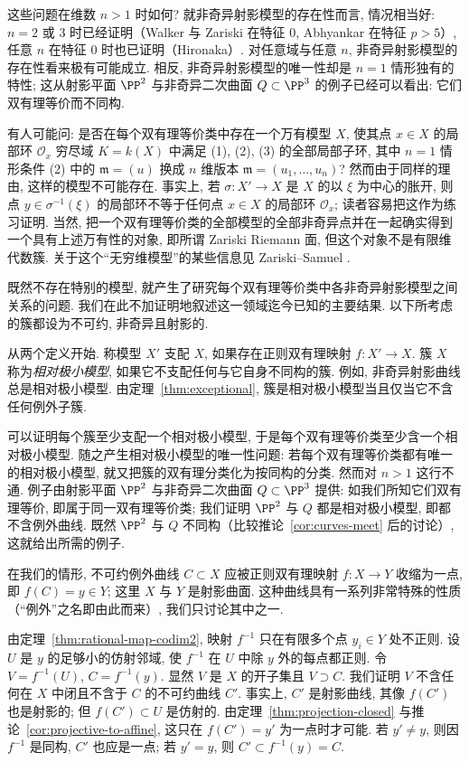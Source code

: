 这些问题在维数 $n > 1$ 时如何? 就非奇异射影模型的存在性而言, 情况相当好: $n = 2$ 或 $3$ 时已经证明（Walker 与 Zariski 在特征 $0$, Abhyankar 在特征 $p > 5$）, 任意 $n$ 在特征 $0$ 时也已证明（Hironaka）. 对任意域与任意 $n$, 非奇异射影模型的存在性看来极有可能成立. 相反, 非奇异射影模型的唯一性却是 $n = 1$ 情形独有的特性; 这从射影平面 $\PP^2$ 与非奇异二次曲面 $Q \subset \PP^3$ 的例子已经可以看出: 它们双有理等价而不同构.

有人可能问: 是否在每个双有理等价类中存在一个万有模型 $X$, 使其点 $x \in X$ 的局部环 $\mathcal O_x$ 穷尽域 $K = k(X)$ 中满足 (1), (2), (3) 的全部局部子环, 其中 $n = 1$ 情形条件 (2) 中的 $\mathfrak m = (u)$ 换成 $n$ 维版本 $\mathfrak m = (u_1, \ldots, u_n)$? 然而由于同样的理由, 这样的模型不可能存在. 事实上, 若 $\sigma: X' \to X$ 是 $X$ 的以 $\xi$ 为中心的胀开, 则点 $y \in \sigma^{-1}(\xi)$ 的局部环不等于任何点 $x \in X$ 的局部环 $\mathcal O_x$; 读者容易把这作为练习证明. 当然, 把一个双有理等价类的全部模型的全部非奇异点并在一起确实得到一个具有上述万有性的对象, 即所谓 Zariski Riemann 面, 但这个对象不是有限维代数簇. 关于这个``无穷维模型''的某些信息见 Zariski--Samuel \cite[第 VI 章第 17 节]{zariski-samuel1960}.

既然不存在特别的模型, 就产生了研究每个双有理等价类中各非奇异射影模型之间关系的问题. 我们在此不加证明地叙述这一领域迄今已知的主要结果. 以下所考虑的簇都设为不可约, 非奇异且射影的.

从两个定义开始. 称模型 $X'$ 支配 $X$, 如果存在正则双有理映射 $f: X' \to X$. 簇 $X$ 称为\emph{相对极小模型}, 如果它不支配任何与它自身不同构的簇. 例如, 非奇异射影曲线总是相对极小模型. 由定理~\ref{thm:exceptional}, 簇是相对极小模型当且仅当它不含任何例外子簇.

可以证明每个簇至少支配一个相对极小模型, 于是每个双有理等价类至少含一个相对极小模型. 随之产生相对极小模型的唯一性问题: 若每个双有理等价类都有唯一的相对极小模型, 就又把簇的双有理分类化为按同构的分类. 然而对 $n > 1$ 这行不通. 例子由射影平面 $\PP^2$ 与非奇异二次曲面 $Q \subset \PP^3$ 提供: 如我们所知它们双有理等价, 即属于同一双有理等价类; 我们证明 $\PP^2$ 与 $Q$ 都是相对极小模型, 即都不含例外曲线. 既然 $\PP^2$ 与 $Q$ 不同构（比较推论~\ref{cor:curves-meet} 后的讨论）, 这就给出所需的例子.

在我们的情形, 不可约例外曲线 $C \subset X$ 应被正则双有理映射 $f: X \to Y$ 收缩为一点, 即 $f(C) = y \in Y$; 这里 $X$ 与 $Y$ 是射影曲面. 这种曲线具有一系列非常特殊的性质（``例外''之名即由此而来）, 我们只讨论其中之一.

由定理~\ref{thm:rational-map-codim2}, 映射 $f^{-1}$ 只在有限多个点 $y_i \in Y$ 处不正则. 设 $U$ 是 $y$ 的足够小的仿射邻域, 使 $f^{-1}$ 在 $U$ 中除 $y$ 外的每点都正则. 令 $V = f^{-1}(U)$, $C = f^{-1}(y)$. 显然 $V$ 是 $X$ 的开子集且 $V \supset C$. 我们证明 $V$ 不含任何在 $X$ 中闭且不含于 $C$ 的不可约曲线 $C'$. 事实上, $C'$ 是射影曲线, 其像 $f(C')$ 也是射影的; 但 $f(C') \subset U$ 是仿射的. 由定理~\ref{thm:projection-closed} 与推论~\ref{cor:projective-to-affine}, 这只在 $f(C') = y'$ 为一点时才可能. 若 $y' \ne y$, 则因 $f^{-1}$ 是同构, $C'$ 也应是一点; 若 $y' = y$, 则 $C' \subset f^{-1}(y) = C$.


